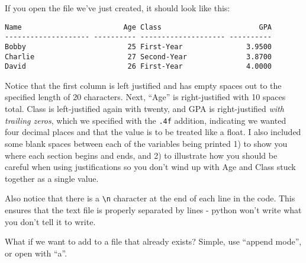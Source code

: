     If you open the file we've just created, it should look like this:

\begin{verbatim}
Name                        Age Class                       GPA
-------------------- ---------- -------------------- ----------
Bobby                        25 First-Year               3.9500
Charlie                      27 Second-Year              3.8700
David                        26 First-Year               4.0000
\end{verbatim}

Notice that the first column is left justified and has empty spaces out
to the specified length of 20 characters. Next, ``Age'' is
right-justified with 10 spaces total. Class is left-justified again with
twenty, and GPA is right-justified \emph{with trailing zeros}, which we
specified with the \texttt{.4f} addition, indicating we wanted four
decimal places and that the value is to be treated like a float. I also
included some blank spaces between each of the variables being printed
1) to show you where each section begins and ends, and 2) to illustrate
how you should be careful when using justifications so you don't wind up
with Age and Class stuck together as a single value.

Also notice that there is a \texttt{\textbackslash{}n} character at the
end of each line in the code. This ensures that the text file is
properly separated by lines - python won't write what you don't tell it
to write.

What if we want to add to a file that already exists? Simple, use
``append mode'', or open with ``a''.

